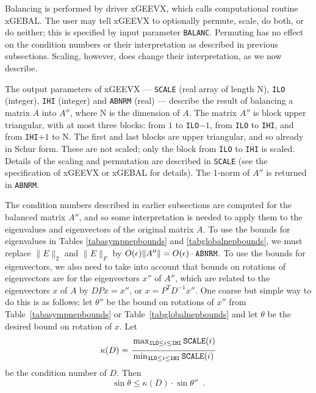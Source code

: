 Balancing is performed by driver xGEEVX, which calls
computational routine xGEBAL. The user may tell xGEEVX to optionally
permute, scale, do both, or do neither; this is specified by input
parameter {\tt BALANC}. Permuting has no effect on
the condition numbers
or their interpretation as described in previous
subsections. Scaling, however, does change their interpretation,
as we now describe.

The output parameters of xGEEVX --- {\tt SCALE} (real array of length N),
{\tt ILO} (integer), {\tt IHI} (integer) and {\tt ABNRM} (real) --- describe
the result of
balancing a matrix $A$ into $A''$, where N is the dimension of $A$.
The matrix $A''$ is block upper triangular, with at most three blocks:
from $1$ to {\tt ILO}$-1$, from {\tt ILO} to {\tt IHI}, and from {\tt IHI}$+1$ to N.
The first and last blocks are upper triangular, and so already in Schur
form. These are not scaled; only the block from {\tt ILO} to {\tt IHI} is scaled.
Details of the scaling and permutation are described in {\tt SCALE} (see the
specification of xGEEVX or xGEBAL for details). The 1-norm of
$A''$ is returned in {\tt ABNRM}.

The condition numbers
described in earlier subsections are computed for
the balanced matrix $A''$, and so some interpretation is needed to
apply them to the eigenvalues and eigenvectors of the original matrix $A$.
To use the bounds for eigenvalues in Tables \ref{tabasympnepbounds} and
\ref{tabglobalnepbounds},
we must replace $\|E\|_2$ and $\|E\|_F$
by $O(\epsilon) \|A''\| = O(\epsilon) \cdot {\tt ABNRM}$. To use the
bounds for eigenvectors, we also need to take into account that bounds
on rotations of eigenvectors are for the eigenvectors $x''$ of
$A''$, which are related to the eigenvectors $x$ of $A$ by
$DPx=x''$, or $x=P^T D^{-1}x''$. One coarse but simple way to do this is
as follows: let $\theta''$ be the bound on rotations of $x''$ from
Table~\ref{tabasympnepbounds} or Table~\ref{tabglobalnepbounds}
and let $\theta$ be the desired bound on rotation of $x$. Let
\[
\kappa (D) =
\frac{{\rule[-.25cm]{0cm}{.5cm} \max_{{\tt ILO} \leq i \leq {\tt IHI}}
{\tt SCALE}(i)}}
{\min_{{\tt ILO} \leq i \leq {\tt IHI}} {\tt SCALE}(i)}
\]
be the condition number of $D$.
Then
\[
\sin \theta \leq \kappa(D) \cdot \sin \theta'' \; \; .
\]

